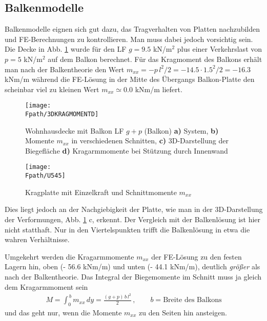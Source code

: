 {\textcolor{sectionTitleBlue}{\section{Balkenmodelle}}}\label{Balkenmodelle}
Balkenmodelle eignen sich gut dazu, das Tragverhalten von Platten nachzubilden und FE-Berech\-nungen zu kontrollieren. Man muss dabei jedoch vorsichtig sein. Die Decke in Abb. \ref{3DKragarmmomente} wurde f\"{u}r den LF $g = 9.5$ kN/m$^2$ plus einer Verkehrslast von $p = 5$ kN/m$^2$ auf dem Balkon berechnet. F\"{u}r das Kragmoment des Balkons erh\"{a}lt man nach der Balkentheorie den Wert $m_{xx} = -p\,l^2/2 = -14.5 \cdot 1.5^2/2 = -16.3$ kNm/m w\"{a}hrend die FE-L\"{o}sung in der Mitte des \"{U}bergangs Balkon-Platte den scheinbar viel zu kleinen Wert $m_{xx} \simeq 0.0$ kNm/m liefert.
\begin{figure}[tbp]
\centering
\if {} \sidecaption \fi
\texttt{[image: \\Fpath/3DKRAGMOMENTD]}
\caption{Wohnhausdecke mit Balkon LF $g + p$ (Balkon) {\bf a)} System, {\bf b)} Momente
$m_{xx}$ in verschiedenen Schnitten, {\bf c)} 3D-Darstellung der Biegefl\"{a}che {\bf d)}
Kragarmmomente bei St\"{u}tzung durch Innenwand} \label{3DKragarmmomente}
\end{figure}%
\begin{figure}[tbp]
\centering
\if {} \sidecaption \fi
\texttt{[image: \\Fpath/U545]}
\caption{Kragplatte mit Einzelkraft und Schnittmomente $m_{xx}$} \label{U545}
\end{figure}%
Dies liegt jedoch an der Nachgiebigkeit der Platte, wie man in der 3D-Darstellung der Verformungen, Abb. \ref{3DKragarmmomente} c, erkennt. Der Vergleich mit der Balkenl\"{o}sung ist hier nicht statthaft. Nur in den Viertelspunkten trifft die Balkenl\"{o}sung in etwa die wahren Verh\"{a}ltnisse.

Umgekehrt werden die Kragarmmomente $m_{xx}$ der FE-L\"{o}sung zu den festen Lagern hin, oben (- 56.6 kNm/m) und unten (- 44.1 kNm/m), deutlich {\em gr\"{o}{\ss}er\/} als nach der Balkentheorie. Das Integral der Biegemomente im Schnitt muss ja gleich dem Kragarmmoment sein
\begin{align}
M = \int_0^{\,b} m_{xx}\,dy = \frac{(g + p)\,b\,l^2}{2}\,, \qquad b = \mbox{Breite des
Balkons}
\end{align}
und das geht nur, wenn die Momente $m_{xx}$ zu den Seiten hin ansteigen.

